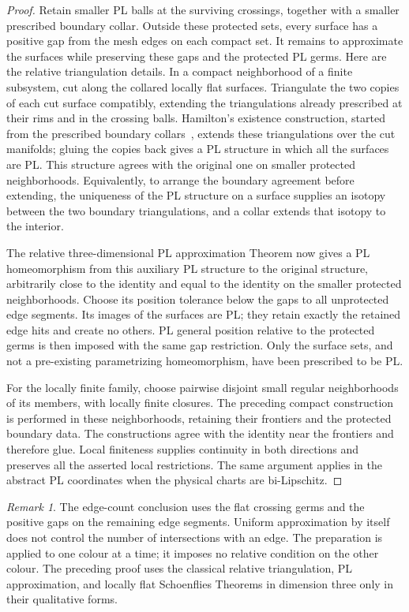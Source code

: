 \documentclass[11pt]{article}
\numberwithin{equation}{section}
\theoremstyle{definition}
\theoremstyle{remark}
\newtheorem{remark}[theorem]{Remark}
\begin{document}
\begin{proof}
Retain smaller PL balls at the surviving crossings, together with a
smaller prescribed boundary collar.  Outside these protected sets,
every surface has a positive gap from the mesh edges on each compact
set.  It remains to approximate the surfaces while preserving these
gaps and the protected PL germs.  Here are the relative triangulation
details.  In a compact neighborhood of a finite subsystem, cut along
the collared locally flat surfaces.  Triangulate the two copies of
each cut surface compatibly, extending the triangulations already
prescribed at their rims and in the crossing balls.  Hamilton's existence construction, started from the prescribed
boundary collars~\cite[Theorem~2.1 and Section~3, p.~69]{Hamilton1976},
extends these triangulations over the cut manifolds; gluing the copies back gives a PL structure in
which all the surfaces are PL.  This structure agrees with the original
one on smaller protected neighborhoods.  Equivalently, to arrange the
boundary agreement before extending, the uniqueness of the PL structure
on a surface supplies an isotopy between the two boundary
triangulations, and a collar extends that isotopy to the interior.

The relative three-dimensional PL approximation Theorem
\cite[Section~3, Theorem~2.2]{Hamilton1976} now gives a
PL homeomorphism from this auxiliary PL structure to the original
structure, arbitrarily close to the identity and equal to the identity
on the smaller protected neighborhoods.  Choose its position tolerance
below the gaps to all unprotected edge segments.  Its images of the
surfaces are PL; they retain exactly the retained edge hits and create
no others.  PL general position relative to the protected germs is
then imposed with the same gap restriction.  Only the surface sets,
and not a pre-existing parametrizing homeomorphism, have been
prescribed to be PL.

For the locally finite family, choose pairwise disjoint small regular
neighborhoods of its members, with locally finite closures.  The
preceding compact construction is performed in these neighborhoods,
retaining their frontiers and the protected boundary data.  The
constructions agree with the identity near the frontiers and therefore
glue.  Local finiteness supplies continuity in both directions and
preserves all the asserted local restrictions.  The same argument
applies in the abstract PL coordinates when the physical charts are
bi-Lipschitz.
\end{proof}

\begin{remark}
The edge-count conclusion uses the flat crossing germs and the positive
gaps on the remaining edge segments.  Uniform approximation by itself
does not control the number of intersections with an edge.  The
preparation is applied to one colour at a time; it imposes no relative
condition on the other colour.  The preceding proof uses the classical
relative triangulation, PL approximation, and locally flat
Schoenflies Theorems in dimension three only in their qualitative
forms.
\end{remark}
\end{document}
